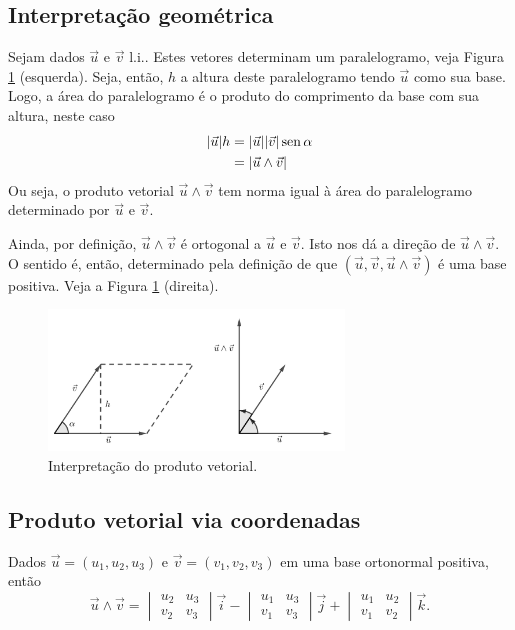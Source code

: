 \subsection{Interpretação geométrica}

Sejam dados $\vec{u}$ e $\vec{v}$ l.i.. Estes vetores determinam um paralelogramo, veja Figura \ref{fig:prodvet_interp} (esquerda). Seja, então, $h$ a altura deste paralelogramo tendo $\vec{u}$ como sua base. Logo, a área do paralelogramo é o produto do comprimento da base com sua altura, neste caso
\begin{align}
  |\vec{u}|h &= |\vec{u}||\vec{v}|\operatorname{sen}\alpha\\
             &= |\vec{u}\land\vec{v}|
\end{align}
Ou seja, o produto vetorial $\vec{u}\land\vec{v}$ tem norma igual à área do paralelogramo determinado por $\vec{u}$ e $\vec{v}$.

Ainda, por definição, $\vec{u}\land\vec{v}$ é ortogonal a $\vec{u}$ e $\vec{v}$. Isto nos dá a direção de $\vec{u}\land\vec{v}$. O sentido é, então, determinado pela definição de que $(\vec{u},\vec{v},\vec{u}\land\vec{v})$ é uma base positiva. Veja a Figura \ref{fig:prodvet_interp} (direita).

\begin{figure}[H]
  \centering
  \includegraphics[width=0.7\textwidth]{./cap_prodvet/dados/fig_prodvet_interp/fig_prodvet_interp}
  \caption{Interpretação do produto vetorial.}
  \label{fig:prodvet_interp}
\end{figure}

\subsection{Produto vetorial via coordenadas}\label{cap_prodvet_sec_coord}

Dados $\vec{u} = (u_1,u_2,u_3)$ e $\vec{v} = (v_1,v_2,v_3)$ em uma base ortonormal positiva, então
\begin{equation}
  \vec{u}\land\vec{v} =
  \begin{vmatrix}
    u_2 & u_3\\
    v_2 & v_3
  \end{vmatrix}\vec{i} -
  \begin{vmatrix}
    u_1 & u_3\\
    v_1 & v_3
  \end{vmatrix}\vec{j} +
  \begin{vmatrix}
    u_1 & u_2 \\
    v_1 & v_2
  \end{vmatrix}\vec{k}.
\end{equation}


